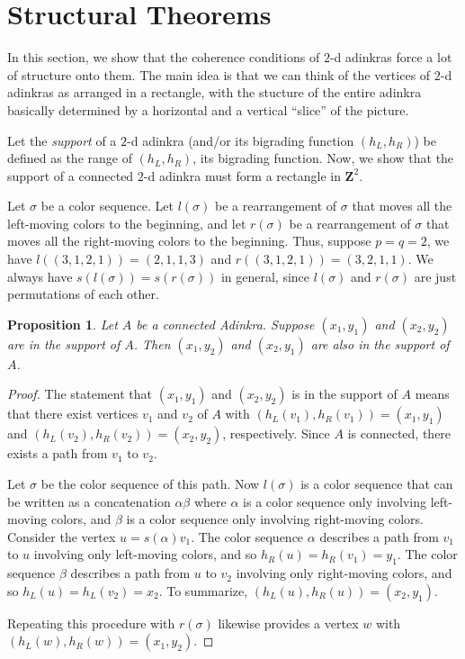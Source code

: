\documentclass[12pt,twoside,singlespace]{article}
\numberwithin{equation}{section}
\newtheorem{prop}[equation]{Proposition}
\theoremstyle{definition}
\newcommand{\ZZ}{\mathbf{Z}}
\begin{document}
\section{Structural Theorems}
\label{sec:structural}

In this section, we show that the coherence conditions of $2$-d adinkras force a lot of structure onto them. The main idea is that we can think of the vertices of $2$-d adinkras as arranged in a rectangle, with the stucture of the entire adinkra basically determined by a horizontal and a vertical ``slice'' of the picture.

Let the \emph{support} of a $2$-d adinkra (and/or its bigrading function $(h_L,h_R)$) be defined as the range of $(h_L,h_R)$, its bigrading function. Now, we show that the support of a connected $2$-d adinkra must form a rectangle in $\ZZ^2$.

Let $\sigma$ be a color sequence.  Let $l(\sigma)$ be a rearrangement of $\sigma$ that moves all the left-moving colors to the beginning, and let $r(\sigma)$ be a rearrangement of $\sigma$ that moves all the right-moving colors to the beginning. Thus, suppose $p = q = 2$, we have $l((3,1,2,1)) = (2,1,1,3)$ and $r((3,1,2,1)) = (3,2,1,1)$. We always have $s(l(\sigma)) = s(r(\sigma))$ in general, since $l(\sigma)$ and $r(\sigma)$ are just permutations of each other.

\begin{prop}
\label{prop:rectangle-completion}
Let $A$ be a connected Adinkra.  Suppose $(x_1,y_1)$ and $(x_2,y_2)$ are in the support of $A$.  Then $(x_1,y_2)$ and $(x_2,y_1)$ are also in the support of $A$.
\end{prop}
\begin{proof}
The statement that $(x_1,y_1)$ and $(x_2,y_2)$ is in the support of $A$ means that there exist vertices $v_1$ and $v_2$ of $A$ with $(h_L(v_1),h_R(v_1))=(x_1,y_1)$ and $(h_L(v_2),h_R(v_2))=(x_2,y_2)$, respectively.  Since $A$ is connected, there exists a path from $v_1$ to $v_2$.

Let $\sigma$ be the color sequence of this path.  Now $l(\sigma)$ is a color sequence that can be written as a concatenation $\alpha\beta$ where $\alpha$ is a color sequence only involving left-moving colors, and $\beta$ is a color sequence only involving right-moving colors.  Consider the vertex $u=s(\alpha)v_1$.  The color sequence $\alpha$ describes a path from $v_1$ to $u$ involving only left-moving colors, and so $h_R(u)=h_R(v_1)=y_1$.  The color sequence $\beta$ describes a path from $u$ to $v_2$ involving only right-moving colors, and so $h_L(u)=h_L(v_2)=x_2$.  To summarize, $(h_L(u),h_R(u))=(x_2,y_1)$.

Repeating this procedure with $r(\sigma)$ likewise provides a vertex $w$ with $(h_L(w),h_R(w))=(x_1,y_2)$.
\end{proof}
\end{document}
